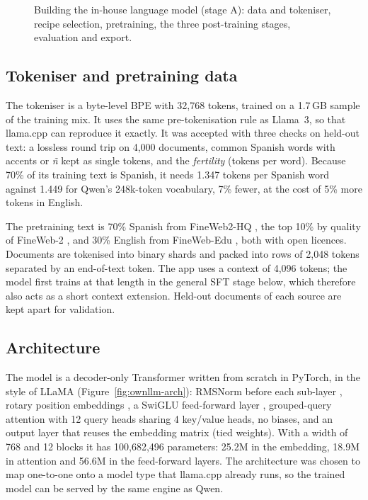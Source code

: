 \begin{figure}[H]
\centering
{}
\caption{Building the in-house language model (stage A): data and tokeniser, recipe selection, pretraining, the three post-training stages, evaluation and export.}
\label{fig:ownllm-flow}
\end{figure}

\subsection*{Tokeniser and pretraining data}

The tokeniser is a byte-level BPE \cite{sennrich2016bpe} with 32{,}768 tokens, trained on a 1.7\,GB sample of the training mix. It uses the same pre-tokenisation rule as Llama~3, so that llama.cpp can reproduce it exactly. It was accepted with three checks on held-out text: a lossless round trip on 4{,}000 documents, common Spanish words with accents or \textit{ñ} kept as single tokens, and the \textit{fertility} (tokens per word). Because 70\% of its training text is Spanish, it needs 1.347 tokens per Spanish word against 1.449 for Qwen's 248k-token vocabulary, 7\% fewer, at the cost of 5\% more tokens in English.

The pretraining text is 70\% Spanish from FineWeb2-HQ \cite{messmer2025fineweb2hq}, the top 10\% by quality of FineWeb-2 \cite{penedo2025fineweb2}, and 30\% English from FineWeb-Edu \cite{penedo2024fineweb}, both with open licences. Documents are tokenised into binary shards and packed into rows of 2{,}048 tokens separated by an end-of-text token. The app uses a context of 4{,}096 tokens; the model first trains at that length in the general SFT stage below, which therefore also acts as a short context extension. Held-out documents of each source are kept apart for validation.

\subsection*{Architecture}

The model is a decoder-only Transformer \cite{vaswani2017attention} written from scratch in PyTorch, in the style of LLaMA \cite{touvron2023llama} (Figure~\ref{fig:ownllm-arch}): RMSNorm before each sub-layer \cite{zhang2019rmsnorm}, rotary position embeddings \cite{su2024roformer}, a SwiGLU feed-forward layer \cite{shazeer2020glu}, grouped-query attention \cite{ainslie2023gqa} with 12 query heads sharing 4 key/value heads, no biases, and an output layer that reuses the embedding matrix (tied weights). With a width of 768 and 12 blocks it has 100{,}682{,}496 parameters: 25.2M in the embedding, 18.9M in attention and 56.6M in the feed-forward layers. The architecture was chosen to map one-to-one onto a model type that llama.cpp already runs, so the trained model can be served by the same engine as Qwen.

